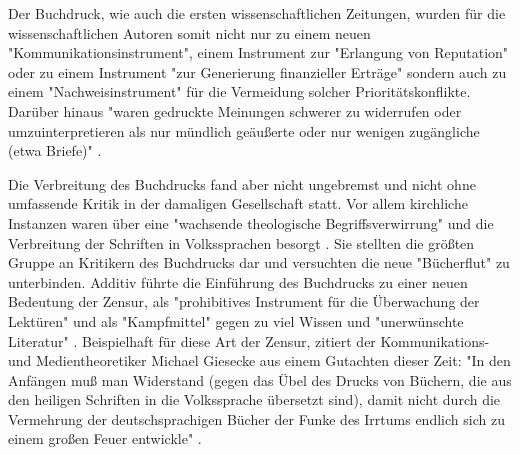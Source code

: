 Der Buchdruck, wie auch die ersten wissenschaftlichen Zeitungen, wurden für die wissenschaftlichen Autoren somit nicht nur zu einem neuen "Kommunikationsinstrument", einem Instrument zur "Erlangung von Reputation" oder zu einem Instrument "zur Generierung finanzieller Erträge" sondern auch zu einem "Nachweisinstrument" \cite{wunderlich_2008_buchdruck} \cite{schirmbacher_2009_wisspub} für die Vermeidung solcher Prioritätskonflikte. Darüber hinaus "waren gedruckte Meinungen schwerer zu widerrufen oder umzuinterpretieren als nur mündlich geäußerte oder nur wenigen zugängliche (etwa Briefe)" \cite{luhmann_1997_gesellschaft}.

Die Verbreitung des Buchdrucks fand aber nicht ungebremst und nicht ohne umfassende Kritik in der damaligen Gesellschaft statt. Vor allem kirchliche Instanzen waren über eine "wachsende theologische Begriffsverwirrung" und die Verbreitung der Schriften in Volkssprachen besorgt \cite{giesecke_1991_buchdruck}. Sie stellten die größten Gruppe an Kritikern des Buchdrucks dar und versuchten die neue "Bücherflut" zu unterbinden\cite{giesecke_1991_buchdruck}. Additiv führte die Einführung des Buchdrucks zu einer neuen Bedeutung der Zensur, als "prohibitives Instrument für die Überwachung der Lektüren" und als "Kampfmittel" \cite{sprachgeschichte_1998_besch} gegen zu viel Wissen \cite{suchen} und "unerwünschte Literatur" \cite{suchen}. Beispielhaft für diese Art der Zensur, zitiert der Kommunikations- und Medientheoretiker Michael Giesecke aus einem Gutachten dieser Zeit: "In den Anfängen muß man Widerstand (gegen das Übel des Drucks von Büchern, die aus den heiligen Schriften in die Volkssprache übersetzt sind), damit nicht durch die Vermehrung der deutschsprachigen Bücher der Funke des Irrtums endlich sich zu einem großen Feuer entwickle" \cite{giesecke_1991_buchdruck}.

